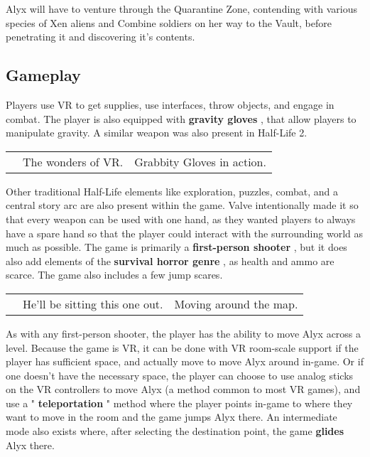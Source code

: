 \documentclass[a4paper,10pt]{book}
\begin{document}
         Alyx will have to venture through the Quarantine Zone, contending with various species of Xen aliens and Combine soldiers on her way to the Vault, before penetrating it and discovering it's contents.
        
 \subsection{Gameplay }
 
         Players use VR to get supplies, use interfaces, throw objects, and engage in combat.
         The player is also equipped with  \textbf{gravity gloves } , that allow players to manipulate gravity. A similar weapon was also present in Half-Life 2.
        
 \begin{longtable}{p{1mm}|l|l|}\hline
 
 & 
 & 
 \\\hline
 
 & The wonders of VR. 
 & Grabbity Gloves in action. 
 \\\hline
 \end{longtable}
 
         Other traditional Half-Life elements like exploration, puzzles, combat, and a central story arc are also present within the game.
         Valve intentionally made it so that every weapon can be used with one hand,
         as they wanted players to always have a spare hand so that the player could interact with the surrounding world as much as possible.
         The game is primarily a  \textbf{first-person shooter } , but it does also add elements of the  \textbf{survival horror genre } , as health and ammo are scarce.
         The game also includes a few jump scares.
        
 \begin{longtable}{p{1mm}|l|l|}\hline
 
 & 
 & 
 \\\hline
 
 & He'll be sitting this one out. 
 & Moving around the map. 
 \\\hline
 \end{longtable}
 
         As with any first-person shooter, the player has the ability to move Alyx across a level.
         Because the game is VR, it can be done with VR room-scale support if the player has sufficient space, and actually move to move Alyx around in-game.
         Or if one doesn't have the necessary space, the player can choose to use analog sticks on the VR controllers to move Alyx
         (a method common to most VR games), and use a " \textbf{teleportation } " method where the player points in-game to where they want to move in the room and the game jumps Alyx there.
         An intermediate mode also exists where, after selecting the destination point, the game  \textbf{glides }  Alyx there.
        
\end{document}
